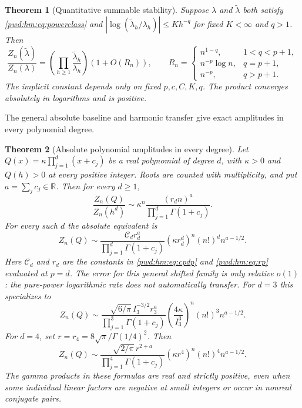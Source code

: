 \documentclass[11pt,letterpaper]{article}
\numberwithin{equation}{section}
\newtheorem{theorem}{Theorem}[section]
\theoremstyle{remark}\newtheorem{remark}[theorem]{Remark}
\begin{document}
\begin{theorem}[Quantitative summable stability]\label{pwd:hm:thm:summable}
Suppose $\lambda$ and $\widetilde\lambda$ both satisfy \eqref{pwd:hm:eq:powerclass} and
$|\log(\widetilde\lambda_h/\lambda_h)|\le K h^{-q}$ for fixed $K<\infty$ and $q>1$. Then
\begin{equation}\label{pwd:hm:eq:summable}
 \frac{Z_n(\widetilde\lambda)}{Z_n(\lambda)}
 =\left(\prod_{h\ge1}\frac{\widetilde\lambda_h}{\lambda_h}\right)(1+O(R_n)),
 \qquad
 R_n=\begin{cases}
 n^{1-q},&1<q<p+1,\\
 n^{-p}\log n,&q=p+1,\\
 n^{-p},&q>p+1.
 \end{cases}
\end{equation}
The implicit constant depends only on fixed $p,c,C,K,q$. The product converges absolutely in logarithms and is positive.
\end{theorem}

The general absolute baseline and harmonic transfer give exact amplitudes in every polynomial degree.
\begin{theorem}[Absolute polynomial amplitudes in every degree]\label{pwd:hm:thm:polynomial-main}
Let $Q(x)=\kappa\prod_{j=1}^d(x+c_j)$ be a real polynomial of degree $d$, with $\kappa>0$ and $Q(h)>0$ at every positive integer. Roots are counted with multiplicity, and put $a=\sum_jc_j\in\mathbb R$. Then for every $d\ge1$,
\begin{equation}\label{pwd:hm:eq:polynomial-relative}
 \frac{Z_n(Q)}{Z_n(h^d)}\sim
 \kappa^n\frac{(r_dn)^a}{\prod_{j=1}^d\Gamma(1+c_j)}.
\end{equation}
For every such $d$ the absolute equivalent is
\begin{equation}\label{pwd:hm:eq:polynomial-absolute}
 Z_n(Q)\sim\frac{\mathcal{C}_dr_d^a}{\prod_{j=1}^d\Gamma(1+c_j)}
 (\kappa r_d^d)^n(n!)^dn^{a-1/2}.
\end{equation}
Here $\mathcal{C}_d$ and $r_d$ are the constants in \eqref{pwd:hm:eq:cpdp} and \eqref{pwd:hm:eq:rp} evaluated at $p=d$. The error for this general shifted family is only relative $o(1)$: the pure-power logarithmic rate does not automatically transfer. For $d=3$ this specializes to
\begin{equation}\label{pwd:hm:eq:cubic-main}
 Z_n(Q)\sim
 \frac{\sqrt{6/\pi}\,I_3^{-3/2}r_3^a}{\prod_{j=1}^3\Gamma(1+c_j)}
 \left(\frac{4\kappa}{I_3^3}\right)^n(n!)^3n^{a-1/2}.
\end{equation}
For $d=4$, set $r=r_4=8\sqrt\pi/\Gamma(1/4)^2$. Then
\begin{equation}\label{pwd:hm:eq:quartic-main}
 Z_n(Q)\sim
 \frac{\sqrt{2/\pi}\,r^{2+a}}{\prod_{j=1}^4\Gamma(1+c_j)}
 (\kappa r^4)^n(n!)^4n^{a-1/2}.
\end{equation}
The gamma products in these formulas are real and strictly positive, even when some individual linear factors are negative at small integers or occur in nonreal conjugate pairs.
\end{theorem}
\end{document}

